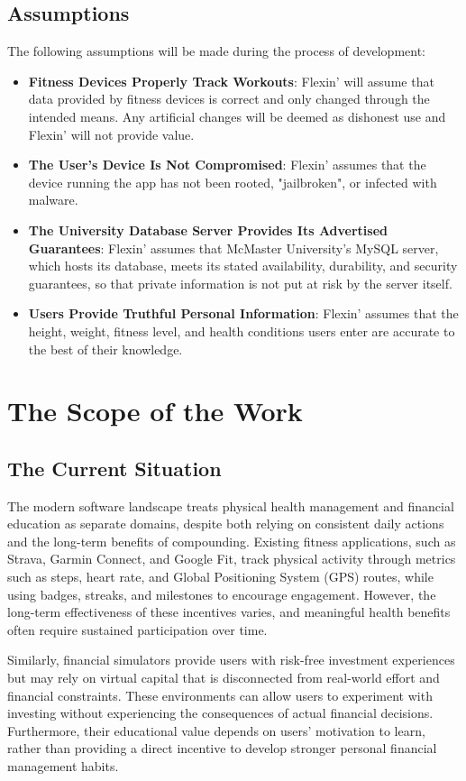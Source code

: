 \documentclass[12pt]{article}
\newcommand{\acr}[3]{\phantomsection\label{acr:#1}#2 (#3)}
\begin{document}
\subsection{Assumptions}
The following assumptions will be made during the process of development:
\begin{itemize}
    \item \textbf{Fitness Devices Properly Track Workouts}: Flexin' will assume that data provided by fitness devices is correct and only changed through the intended means. Any artificial changes will be deemed as dishonest use and Flexin' will not provide value.
    \item \textbf{The User's Device Is Not Compromised}: Flexin' assumes that the device running the app has not been rooted, "jailbroken", or infected with malware. 
    \item \textbf{The University Database Server Provides Its Advertised Guarantees}: Flexin' assumes that McMaster University's MySQL server, which hosts its database, meets its stated availability, durability, and security guarantees, so that private information is not put at risk by the server itself.
    \item \textbf{Users Provide Truthful Personal Information}: Flexin' assumes that the height, weight, fitness level, and health conditions users enter are accurate to the best of their knowledge.
\end{itemize}

\section{The Scope of the Work}
\subsection{The Current Situation}

The modern software landscape treats physical health management and
financial education as separate domains, despite both relying on
consistent daily actions and the long-term benefits of compounding.
Existing fitness applications, such as Strava, Garmin Connect, and
Google Fit, track physical activity through metrics such as steps,
heart rate, and \acr{GPS}{Global Positioning System}{GPS} routes, while using badges, streaks, and milestones
to encourage engagement. However, the long-term effectiveness of these
incentives varies, and meaningful health benefits often require
sustained participation over time.

Similarly, financial simulators provide users with risk-free investment
experiences but may rely on virtual capital that is disconnected from
real-world effort and financial constraints. These environments can
allow users to experiment with investing without experiencing the
consequences of actual financial decisions. Furthermore, their
educational value depends on users' motivation to learn, rather than
providing a direct incentive to develop stronger personal financial
management habits.
\end{document}
